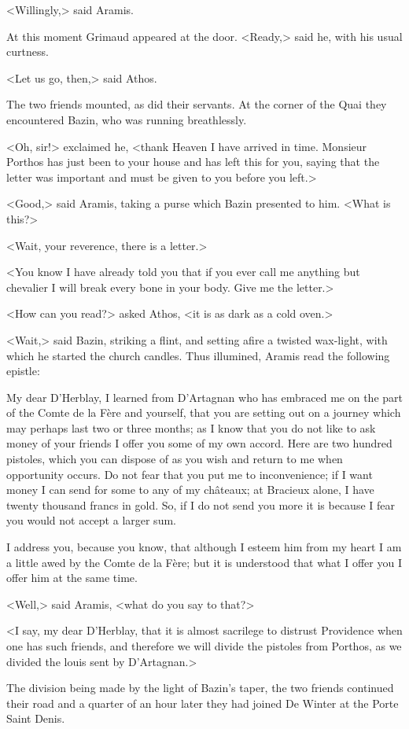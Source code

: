 <Willingly,> said Aramis.

At this moment Grimaud appeared at the door. <Ready,> said he, with his usual curtness.

<Let us go, then,> said Athos.

The two friends mounted, as did their servants. At the corner of the Quai they encountered Bazin, who was running breathlessly.

<Oh, sir!> exclaimed he, <thank Heaven I have arrived in time. Monsieur Porthos has just been to your house and has left this for you, saying that the letter was important and must be given to you before you left.>

<Good,> said Aramis, taking a purse which Bazin presented to him. <What is this?>

<Wait, your reverence, there is a letter.>

<You know I have already told you that if you ever call me anything but chevalier I will break every bone in your body. Give me the letter.>

<How can you read?> asked Athos, <it is as dark as a cold oven.>

<Wait,> said Bazin, striking a flint, and setting afire a twisted wax-light, with which he started the church candles. Thus illumined, Aramis read the following epistle:

\begin{mail}{}{My dear D'Herblay,}
I learned from D'Artagnan who has embraced me on the part of the Comte de la Fère and yourself, that you are setting out on a journey which may perhaps last two or three months; as I know that you do not like to ask money of your friends I offer you some of my own accord. Here are two hundred pistoles, which you can dispose of as you wish and return to me when opportunity occurs. Do not fear that you put me to inconvenience; if I want money I can send for some to any of my châteaux; at Bracieux alone, I have twenty thousand francs in gold. So, if I do not send you more it is because I fear you would not accept a larger sum.

I address you, because you know, that although I esteem him from my heart I am a little awed by the Comte de la Fère; but it is understood that what I offer you I offer him at the same time.

\end{mail}

<Well,> said Aramis, <what do you say to that?>

<I say, my dear D'Herblay, that it is almost sacrilege to distrust Providence when one has such friends, and therefore we will divide the pistoles from Porthos, as we divided the louis sent by D'Artagnan.>

The division being made by the light of Bazin's taper, the two friends continued their road and a quarter of an hour later they had joined De Winter at the Porte Saint Denis.